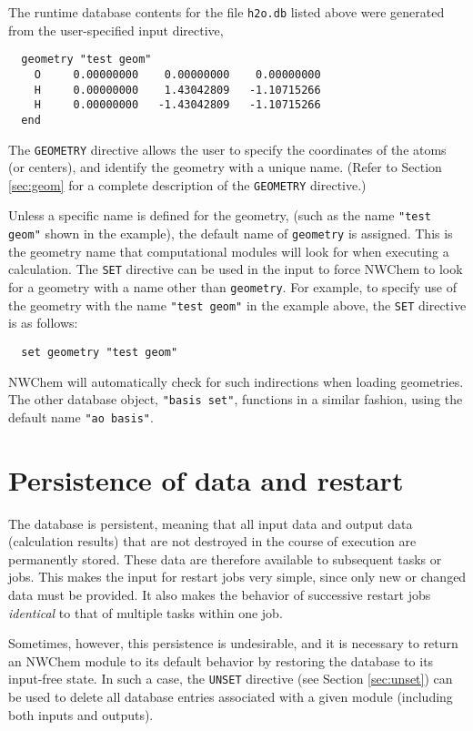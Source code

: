 The runtime database contents for the file \verb+h2o.db+ listed above
were generated from the user-specified input directive,
\begin{verbatim}
  geometry "test geom"
    O     0.00000000    0.00000000    0.00000000
    H     0.00000000    1.43042809   -1.10715266
    H     0.00000000   -1.43042809   -1.10715266
  end
\end{verbatim}
The \verb+GEOMETRY+ directive allows the user to specify the
coordinates of the atoms (or centers), and identify the geometry with
a unique name.  (Refer to Section \ref{sec:geom} for a complete
description of the {\tt GEOMETRY} directive.)

Unless a specific name is defined for the geometry, (such as the name
\verb+"test geom"+ shown in the example), the default name of
\verb+geometry+ is assigned.  This is the geometry name that
computational modules will look for when executing a calculation.  The
{\tt SET} directive can be used in the input to force NWChem to look
for a geometry with a name other than \verb+geometry+.  For example,
to specify use of the geometry with the name \verb+"test geom"+ in the
example above, the \verb+SET+ directive is as follows:

\begin{verbatim}
  set geometry "test geom"
\end{verbatim}

NWChem will automatically check for such indirections when loading
geometries.  The other database object, \verb+"basis set"+, functions
in a similar fashion, using the default name \verb+"ao basis"+.

\section{Persistence of data and restart}
\label{sec:persist}

The database is persistent, meaning that all input data and output
data (calculation results) that are not destroyed in the course of
execution are permanently stored.  These data are therefore available
to subsequent tasks or jobs.  This makes the input for restart jobs
very simple, since only new or changed data must be provided.  It also
makes the behavior of successive restart jobs {\em identical} to that
of multiple tasks within one job.

Sometimes, however, this persistence is undesirable, and it is
necessary to return an NWChem module to its default behavior by
restoring the database to its input-free state.  In such a case, the
\verb+UNSET+ directive (see Section \ref{sec:unset}) can be used to
delete all database entries associated with a given module (including
both inputs and outputs).

